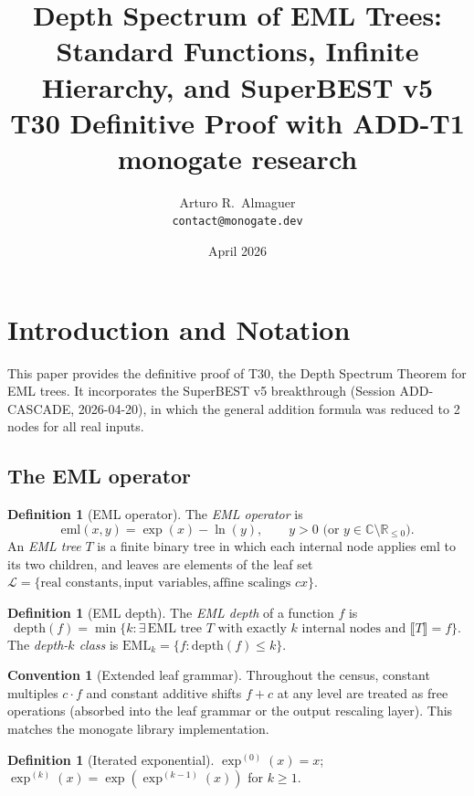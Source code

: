 \documentclass[12pt,a4paper]{article}
\title{Depth Spectrum of EML Trees:\\
       Standard Functions, Infinite Hierarchy, and SuperBEST v5\\
       \large T30 Definitive Proof with ADD-T1\\
       \normalsize monogate research}
\author{Arturo R.\ Almaguer\\
\small \texttt{contact@monogate.dev}}
\date{April 2026}
\theoremstyle{definition}
\newtheorem{definition}[theorem]{Definition}
\newtheorem{convention}[theorem]{Convention}
\theoremstyle{remark}
\begin{document}
\maketitle
\tableofcontents

\section{Introduction and Notation}
\label{sec:intro}

This paper provides the definitive proof of T30, the Depth Spectrum Theorem for EML trees.
It incorporates the SuperBEST v5 breakthrough (Session ADD-CASCADE, 2026-04-20), in which
the general addition formula was reduced to 2 nodes for all real inputs.

\subsection{The EML operator}

\begin{definition}[EML operator]\label{def:eml}
The \emph{EML operator} is
\[
  \mathrm{eml}(x,y) = \exp(x) - \ln(y), \qquad y > 0 \text{ (or } y \in \mathbb{C} \setminus \mathbb{R}_{\leq 0}).
\]
An \emph{EML tree} $T$ is a finite binary tree in which each internal node applies
$\mathrm{eml}$ to its two children, and leaves are elements of the leaf set
$\mathcal{L} = \{\text{real constants}, \text{input variables}, \text{affine scalings } cx\}$.
\end{definition}

\begin{definition}[EML depth]\label{def:depth}
The \emph{EML depth} of a function $f$ is
\[
  \mathrm{depth}(f) = \min\bigl\{k : \exists\,\text{EML tree }T
  \text{ with exactly }k \text{ internal nodes and }\llbracket T\rrbracket = f\bigr\}.
\]
The \emph{depth-$k$ class} is $\mathrm{EML}_k = \{f : \mathrm{depth}(f) \leq k\}$.
\end{definition}

\begin{convention}[Extended leaf grammar]\label{conv:grammar}
Throughout the census, constant multiples $c \cdot f$ and constant additive shifts $f + c$
at any level are treated as free operations (absorbed into the leaf grammar or the output
rescaling layer). This matches the monogate library implementation.
\end{convention}

\begin{definition}[Iterated exponential]\label{def:iterexp}
$\exp^{(0)}(x) = x$; $\exp^{(k)}(x) = \exp(\exp^{(k-1)}(x))$ for $k \geq 1$.
\end{definition}
\end{document}
